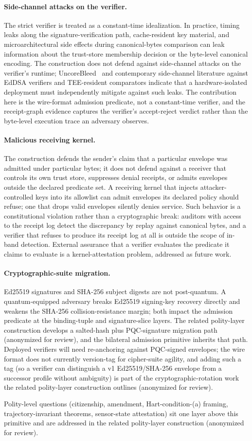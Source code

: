\paragraph{Side-channel attacks on the verifier.} The strict verifier is treated as a constant-time idealization. In practice, timing leaks along the signature-verification path, cache-resident key material, and microarchitectural side effects during canonical-bytes comparison can leak information about the trust-store membership decision or the byte-level canonical encoding. The construction does not defend against side-channel attacks on the verifier's runtime; UncoreBleed~\cite{uncoreBleed2026} and contemporary side-channel literature against EdDSA verifiers and TEE-resident comparators indicate that a hardware-isolated deployment must independently mitigate against such leaks. The contribution here is the wire-format admission predicate, not a constant-time verifier, and the receipt-graph evidence captures the verifier's accept-reject verdict rather than the byte-level execution trace an adversary observes.

\paragraph{Malicious receiving kernel.} The construction defends the sender's claim that a particular envelope was admitted under particular bytes; it does not defend against a receiver that controls its own trust store, suppresses denial receipts, or admits envelopes outside the declared predicate set. A receiving kernel that injects attacker-controlled keys into its allowlist can admit envelopes its declared policy should refuse; one that drops valid envelopes silently denies service. Such behavior is a constitutional violation rather than a cryptographic break: auditors with access to the receipt log detect the discrepancy by replay against canonical bytes, and a verifier that refuses to produce its receipt log at all is outside the scope of in-band detection. External assurance that a verifier evaluates the predicate it claims to evaluate is a kernel-attestation problem, addressed as future work.

\paragraph{Cryptographic-suite migration.} Ed25519 signatures and SHA-256 subject digests are not post-quantum. A quantum-equipped adversary breaks Ed25519 signing-key recovery directly and weakens the SHA-256 collision-resistance margin; both impact the admission predicate at the binding-tuple and signature-slice layers. The related polity-layer construction develops a salted-hash plus PQC-signature migration path (anonymized for review), and the bilateral admission primitive inherits that path. Deployed verifiers will need re-anchoring against PQC-signed envelopes; the wire format does not currently version-tag for cipher-suite agility, and adding such a tag (so a verifier can distinguish a v1 Ed25519/SHA-256 envelope from a successor profile without ambiguity) is part of the cryptographic-rotation work the related polity-layer construction outlines (anonymized for review).

Polity-level questions (citizenship, amendment, Hart-condition-(a) framing, trajectory-invariant theorems, sensor-state attestation) sit one layer above this primitive and are addressed in the related polity-layer construction (anonymized for review).
